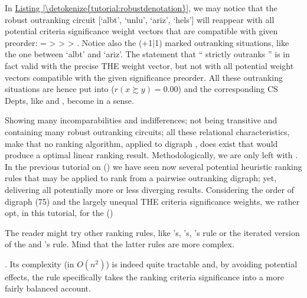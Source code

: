 \documentclass[a4paper,12pt,english]{sphinxhowto}
\begin{document}
In \hyperref[\detokenize{tutorial:robustdenotation}]{Listing \ref{\detokenize{tutorial:robustdenotation}}}, we may notice that the robust outranking circuit {[}‘albt’, ‘unlu’, ‘ariz’, ‘hels’{]}  will reappear with all potential criteria significance weight vectors that are compatible with given preorder:  =  \textgreater{}  \textgreater{}  \textgreater{} . Notice also the (+1|\sphinxhyphen{}1) marked outranking situations, like the one between ‘albt’ and ‘ariz’. The statement that “ strictly  outranks ” is in fact valid with the precise THE weight vector, but not with all potential weight vectors compatible with the given significance preorder. All these outranking situations are hence put into  (\(r(x \succsim y) = 0.00\)) and the corresponding CS Depts, like  and , become  in a  sense.

Showing many incomparabilities and indifferences; not being transitive and containing many robust outranking circuits; all these relational characteristics, make that no ranking algorithm, applied to digraph , does exist that would produce a  optimal linear ranking result. Methodologically, we are only left with . In the previous tutorial on {\hyperref[\detokenize{tutorial:ranking-tutorial-label}]{}} () we have seen now several potential heuristic ranking rules that may be applied to rank from a pairwise outranking digraph; yet, delivering all potentially more or less diverging results. Considering the order of digraph  (75) and the largely unequal THE criteria significance weights, we rather opt, in this tutorial, for the {\hyperref[\detokenize{tutorial:netflows-ranking-label}]{}} () %
\begin{footnote}[41]\sphinxAtStartFootnote
The reader might try other ranking rules, like ’s, ’s, ’s rule or the iterated version of the  and ’s rule. Mind that the latter  rules are more complex.
%
\end{footnote}. Its complexity (in \(O(n^2)\)) is indeed quite tractable and, by avoiding potential  effects, the  rule specifically takes the ranking criteria significance into a more fairly balanced account.
\end{document}
